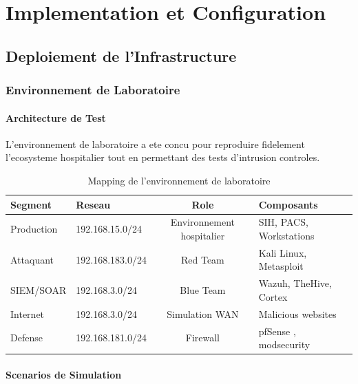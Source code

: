 \chapter{Implementation et Configuration}

\section{Deploiement de l'Infrastructure}

\subsection{Environnement de Laboratoire}

\subsubsection{Architecture de Test}

L'environnement de laboratoire a ete concu pour reproduire fidelement l'ecosysteme hospitalier tout en permettant des tests d'intrusion controles.

\begin{table}[H]
    \centering
    \caption{Mapping de l'environnement de laboratoire}
    \begin{tabular}{|l|l|c|l|}
        \hline
        \textbf{Segment} & \textbf{Reseau}  & \textbf{Role}             & \textbf{Composants}     \\
        \hline
        Production       & 192.168.15.0/24  & Environnement hospitalier & SIH, PACS, Workstations \\
        \hline
        Attaquant        & 192.168.183.0/24 & Red Team                  & Kali Linux, Metasploit  \\
        \hline
        SIEM/SOAR        & 192.168.3.0/24   & Blue Team                 & Wazuh, TheHive, Cortex  \\
        \hline
        Internet         & 192.168.3.0/24   & Simulation WAN            & Malicious websites      \\
        \hline
        Defense          & 192.168.181.0/24 & Firewall                  & pfSense , modsecurity   \\
        \hline
    \end{tabular}
\end{table}

\subsubsection{Scenarios de Simulation}

